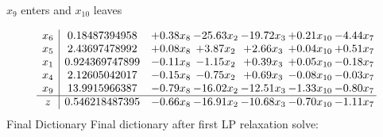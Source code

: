 \documentclass[8pt]{article}
\begin{document}
 $ x_{9} $ enters and $ x_{10} $ leaves 

 \[\begin{array}{c| c c@{\hskip 2pt} c@{\hskip 2pt} c@{\hskip 2pt} c@{\hskip 2pt} c@{\hskip 2pt} }
 x_{6}   &  0.18487394958 & +  0.38 x_{8} & -25.63 x_{2} & -19.72 x_{3} & +  0.21 x_{10} & -4.44 x_{7}\\
 x_{5}   &  2.43697478992 & +  0.08 x_{8} & +  3.87 x_{2} & +  2.66 x_{3} & +  0.04 x_{10} & +  0.51 x_{7}\\
 x_{1}   &  0.924369747899 & -0.11 x_{8} & -1.15 x_{2} & +  0.39 x_{3} & +  0.05 x_{10} & -0.18 x_{7}\\
 x_{4}   &  2.12605042017 & -0.15 x_{8} & -0.75 x_{2} & +  0.69 x_{3} & -0.08 x_{10} & -0.03 x_{7}\\
 x_{9}   &  13.9915966387 & -0.79 x_{8} & -16.02 x_{2} & -12.51 x_{3} & -1.33 x_{10} & -0.80 x_{7}\\
\hline
z    &  0.546218487395 & -0.66 x_{8} & -16.91 x_{2} & -10.68 x_{3} & -0.70 x_{10} & -1.11 x_{7}\\
\end{array}\]
Final Dictionary
Final dictionary after first LP relaxation solve: 
\end{document}
